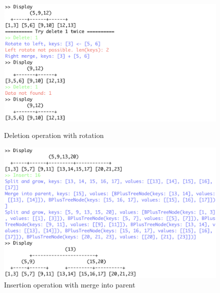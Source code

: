 \documentclass[11pt]{article}
\begin{document}
\begin{figure}[h!]
    \begin{minipage}[t]{0.48\textwidth}
        \centering
        \includegraphics[width=\textwidth]{figs/deletion.png}
        \caption{Deletion operation with rotation}
        \label{fig:deletion}
    \end{minipage}
    \hfill
    \begin{minipage}[t]{0.48\textwidth}
        \centering
        \includegraphics[width=\textwidth]{figs/parent_merge.png}
        \caption{Insertion operation with merge into parent}
        \label{fig:parent_merge}
    \end{minipage}
\end{figure}
\end{document}
